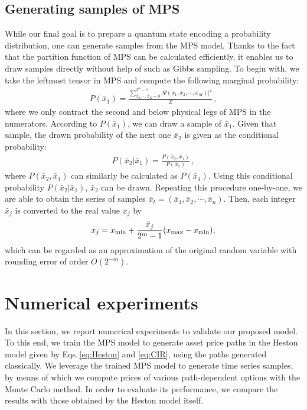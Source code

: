 {\subsection{Generating samples of MPS}
While our final goal is to prepare a quantum state encoding a probability distribution, one can generate samples from the MPS model.
Thanks to the fact that the partition function of MPS can be calculated efficiently, it enables us to draw samples directly without help of such as Gibbs sampling.
To begin with, we take the leftmost tensor in MPS and compute the following marginal probability:
\begin{align}
    P(\bar x_1) = \frac{\sum_{\bar{x}_2,\cdots,\bar{x}_M = 0}^{2^m-1} |\Psi(\bar x_1,\bar{x}_2,\cdots,\bar{x}_M)|^2}{Z} \, ,
\end{align}
where we only contract the second and below physical legs of MPS in the numerators.
According to $P(\bar x_1)$, we can draw a sample of $\bar x_1$. 
Given that sample, the drawn probability of the next one $\bar x_2$ is given as the conditional probability:
\begin{align}
    P(\bar x_2 | \bar x_1) = \frac{P(\bar x_2, \bar x_1)}{P(\bar x_1)}  \, , 
\end{align}
where $P(\bar x_2, \bar x_1)$ can similarly be calculated as $P(\bar x_1)$.
Using this conditional probability $P(\bar x_2 | \bar x_1) $, $\bar x_2$ can be drawn.
Repeating this procedure one-by-one, we are able to obtain the series of samples ${\bar x_t} = (\bar x_1, \bar x_2 ,\cdots , \bar x_n)$.
Then, each integer $\bar{x}_j$ is converted to the real value $x_j$ by
\begin{align}
    x_j = x_{\rm min} + \frac{\bar{x}_j}{2^m-1}(x_{\rm max}-x_{\rm min}),
    \label{eq:IntToReal}
\end{align}
which can be regarded as an approximation of the original random variable with rounding error of order $O(2^{-m})$.

\section{Numerical experiments}\label{sec:experiment}
In this section, we report numerical experiments to validate our proposed model.
To this end, we train the MPS model to generate asset price paths in the Heston model given by Eqs.\,\eqref{eq:Heston} and \eqref{eq:CIR}, using the paths generated classically. 
We leverage the trained MPS model to generate time series samples, by means of which we compute prices of various path-dependent options with the Monte Carlo method.
In order to evaluate its performance, we compare the results with those obtained by the Heston model itself.

}
